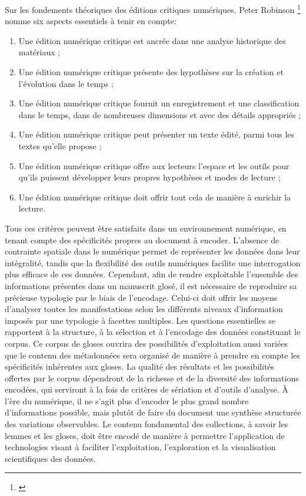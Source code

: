 \documentclass[a4paper, twoside, 12pt]{book}
\begin{document}
Sur les fondements théoriques des éditions critiques numériques, Peter Robinson \footnote{\cite{robinson2001critical}} nomme six aspects essentiels à tenir en compte:

\begin{enumerate}
  \item Une édition numérique critique est ancrée dans une analyse historique des matériaux ;
  \item Une édition numérique critique présente des hypothèses sur la création et l’évolution dans le temps ;
  \item Une édition numérique critique fournit un enregistrement et une classification dans le temps, dans de nombreuses dimensions et avec des détails appropriés ;
  \item Une édition numérique critique peut présenter un texte édité, parmi tous les textes qu'elle propose ;
  \item Une édition numérique critique offre aux lecteurs l’espace et les outils pour qu’ils puissent développer leurs propres hypothèses et modes de lecture ;
  \item Une édition numérique critique doit offrir tout cela de manière à enrichir la lecture.
\end{enumerate}

Tous ces critères peuvent être satisfaits dans un environnement numérique, en tenant compte des spécificités propres au document à encoder. L'absence de contrainte spatiale dans le numérique permet de représenter les données dans leur intégralité, tandis que la flexibilité des outils numériques facilite une interrogation plus efficace de ces données. Cependant, afin de rendre exploitable l'ensemble des informations présentes dans un manuscrit glosé, il est nécessaire de reproduire sa précieuse typologie par le biais de l'encodage. Celui-ci doit offrir les moyens d'analyser toutes les manifestations selon les différents niveaux d'information imposés par une typologie à facettes multiples. Les questions essentielles se rapportent à la structure, à la sélection et à l'encodage des données constituant le corpus. Ce corpus de gloses ouvrira des possibilités d'exploitation aussi variées que le contenu des métadonnées sera organisé de manière à prendre en compte les spécificités inhérentes aux gloses. La qualité des résultats et les possibilités offertes par le corpus dépendront de la richesse et de la diversité des informations encodées, qui serviront à la fois de critères de sériation et d'outils d'analyse. À l'ère du numérique, il ne s'agit plus d'encoder le plus grand nombre d'informations possible, mais plutôt de faire du document une \og{}synthèse structurée des variations observables\fg{}. Le contenu fondamental des collections, à savoir les lemmes et les gloses, doit être encodé de manière à permettre l'application de technologies visant à faciliter l'exploitation, l'exploration et la visualisation scientifiques des données.
\end{document}
